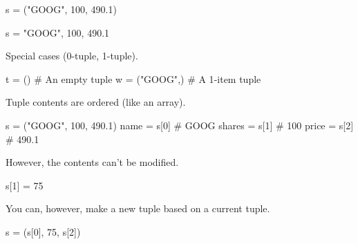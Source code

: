 \documentclass[
  letterpaper,
  DIV=11,
  numbers=noendperiod]{scrreprt}
\newenvironment{Shaded}{\begin{snugshade}}{\end{snugshade}}
\newcommand{\CommentTok}[1]{\textcolor[rgb]{0.37,0.37,0.37}{#1}}
\newcommand{\DecValTok}[1]{\textcolor[rgb]{0.68,0.00,0.00}{#1}}
\newcommand{\FloatTok}[1]{\textcolor[rgb]{0.68,0.00,0.00}{#1}}
\newcommand{\NormalTok}[1]{\textcolor[rgb]{0.00,0.46,0.62}{#1}}
\newcommand{\OperatorTok}[1]{\textcolor[rgb]{0.37,0.37,0.37}{#1}}
\newcommand{\StringTok}[1]{\textcolor[rgb]{0.13,0.47,0.30}{#1}}
\begin{document}
\begin{Shaded}
\begin{Highlighting}[]
\NormalTok{s }\OperatorTok{=}\NormalTok{ (}\StringTok{"GOOG"}\NormalTok{, }\DecValTok{100}\NormalTok{, }\FloatTok{490.1}\NormalTok{)}
\end{Highlighting}
\end{Shaded}

\begin{Shaded}
\begin{Highlighting}[]
\NormalTok{s }\OperatorTok{=} \StringTok{"GOOG"}\NormalTok{, }\DecValTok{100}\NormalTok{, }\FloatTok{490.1}
\end{Highlighting}
\end{Shaded}

Special cases (0-tuple, 1-tuple).

\begin{Shaded}
\begin{Highlighting}[]
\NormalTok{t }\OperatorTok{=}\NormalTok{ ()  }\CommentTok{\# An empty tuple}
\NormalTok{w }\OperatorTok{=}\NormalTok{ (}\StringTok{"GOOG"}\NormalTok{,)  }\CommentTok{\# A 1{-}item tuple}
\end{Highlighting}
\end{Shaded}

Tuple contents are ordered (like an array).

\begin{Shaded}
\begin{Highlighting}[]
\NormalTok{s }\OperatorTok{=}\NormalTok{ (}\StringTok{"GOOG"}\NormalTok{, }\DecValTok{100}\NormalTok{, }\FloatTok{490.1}\NormalTok{)}
\NormalTok{name }\OperatorTok{=}\NormalTok{ s[}\DecValTok{0}\NormalTok{]  }\CommentTok{\# \textquotesingle{}GOOG\textquotesingle{}}
\NormalTok{shares }\OperatorTok{=}\NormalTok{ s[}\DecValTok{1}\NormalTok{]  }\CommentTok{\# 100}
\NormalTok{price }\OperatorTok{=}\NormalTok{ s[}\DecValTok{2}\NormalTok{]  }\CommentTok{\# 490.1}
\end{Highlighting}
\end{Shaded}

However, the contents can't be modified.

s{[}1{]} = 75

You can, however, make a new tuple based on a current tuple.

\begin{Shaded}
\begin{Highlighting}[]
\NormalTok{s }\OperatorTok{=}\NormalTok{ (s[}\DecValTok{0}\NormalTok{], }\DecValTok{75}\NormalTok{, s[}\DecValTok{2}\NormalTok{])}
\end{Highlighting}
\end{Shaded}
\end{document}
